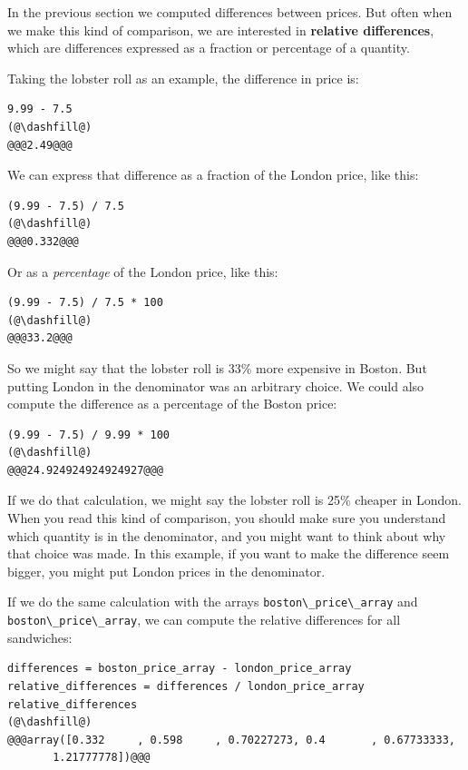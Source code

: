 In the previous section we computed differences between prices. But
often when we make this kind of comparison, we are interested in
\textbf{relative differences}, which are differences expressed as a
fraction or percentage of a quantity.

Taking the lobster roll as an example, the difference in price is:

\begin{lstlisting}[]
9.99 - 7.5
(@\dashfill@)
@@@2.49@@@
\end{lstlisting}

We can express that difference as a fraction of the London price, like
this:

\begin{lstlisting}[]
(9.99 - 7.5) / 7.5
(@\dashfill@)
@@@0.332@@@
\end{lstlisting}

Or as a \emph{percentage} of the London price, like this:

\begin{lstlisting}[]
(9.99 - 7.5) / 7.5 * 100
(@\dashfill@)
@@@33.2@@@
\end{lstlisting}

So we might say that the lobster roll is 33\% more expensive in Boston.
But putting London in the denominator was an arbitrary choice. We could
also compute the difference as a percentage of the Boston price:

\begin{lstlisting}[]
(9.99 - 7.5) / 9.99 * 100
(@\dashfill@)
@@@24.924924924924927@@@
\end{lstlisting}

If we do that calculation, we might say the lobster roll is 25\% cheaper
in London. When you read this kind of comparison, you should make sure
you understand which quantity is in the denominator, and you might want
to think about why that choice was made. In this example, if you want to
make the difference seem bigger, you might put London prices in the
denominator.

If we do the same calculation with the arrays
\passthrough{\lstinline!boston\_price\_array!} and
\passthrough{\lstinline!boston\_price\_array!}, we can compute the
relative differences for all sandwiches:

\begin{lstlisting}[]
differences = boston_price_array - london_price_array
relative_differences = differences / london_price_array
relative_differences
(@\dashfill@)
@@@array([0.332     , 0.598     , 0.70227273, 0.4       , 0.67733333,
       1.21777778])@@@
\end{lstlisting}

